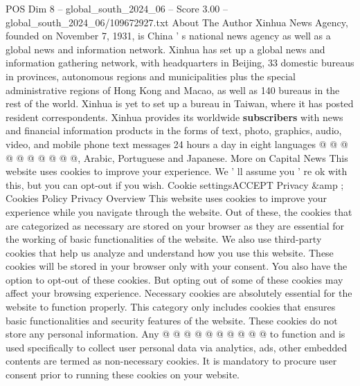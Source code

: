 \begin{textsample}{POS Dim 8 – global\_south\_2024\_06 – Score 3.00 – global\_south\_2024\_06/109672927.txt}
About The Author Xinhua News Agency, founded on November 7, 1931, is China ' s national news agency as well as a global news and information network.
Xinhua has set up a global news and information gathering network, with headquarters in Beijing, 33 domestic bureaus in provinces, autonomous regions and municipalities plus the special administrative regions of Hong Kong and Macao, as well as 140 bureaus in the rest of the world.
Xinhua is yet to set up a bureau in Taiwan, where it has posted resident correspondents.
Xinhua provides its worldwide \textbf{subscribers} with news and financial information products in the forms of text, photo, graphics, audio, video, and mobile phone text messages 24 hours a day in eight languages @ @ @ @ @ @ @ @ @ @, Arabic, Portuguese and Japanese.
More on Capital News This website uses cookies to improve your experience.
We ' ll assume you ' re ok with this, but you can opt-out if you wish.
Cookie settingsACCEPT Privacy \&amp ; Cookies Policy Privacy Overview This website uses cookies to improve your experience while you navigate through the website.
Out of these, the cookies that are categorized as necessary are stored on your browser as they are essential for the working of basic functionalities of the website.
We also use third-party cookies that help us analyze and understand how you use this website.
These cookies will be stored in your browser only with your consent.
You also have the option to opt-out of these cookies.
But opting out of some of these cookies may affect your browsing experience.
Necessary cookies are absolutely essential for the website to function properly.
This category only includes cookies that ensures basic functionalities and security features of the website.
These cookies do not store any personal information.
Any @ @ @ @ @ @ @ @ @ @ to function and is used specifically to collect user personal data via analytics, ads, other embedded contents are termed as non-necessary cookies.
It is mandatory to procure user consent prior to running these cookies on your website.

\end{textsample}
